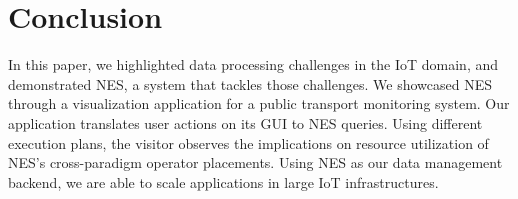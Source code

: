 \section{Conclusion}
\label{conclusion}
In this paper, we highlighted data processing challenges in the IoT domain, and demonstrated NES, a system that tackles those challenges. We showcased NES through a visualization application for a public transport monitoring system. 
Our application translates user actions on its GUI to NES queries. Using different execution plans, the visitor observes the implications on resource utilization of NES's cross-paradigm operator placements. Using NES as our data management backend, we are able to scale applications in large IoT infrastructures.

